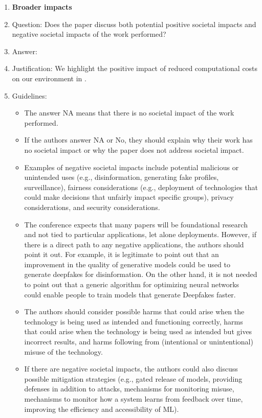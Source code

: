 \documentclass{article}
\begin{document}
\begin{enumerate}
\item {\bf Broader impacts}
    \item[] Question: Does the paper discuss both potential positive societal impacts and negative societal impacts of the work performed?
    \item[] Answer: \answerYes{} %
    \item[] Justification: We highlight the positive impact of reduced computational costs on our environment in .
    \item[] Guidelines:
    \begin{itemize}
        \item The answer NA means that there is no societal impact of the work performed.
        \item If the authors answer NA or No, they should explain why their work has no societal impact or why the paper does not address societal impact.
        \item Examples of negative societal impacts include potential malicious or unintended uses (e.g., disinformation, generating fake profiles, surveillance), fairness considerations (e.g., deployment of technologies that could make decisions that unfairly impact specific groups), privacy considerations, and security considerations.
        \item The conference expects that many papers will be foundational research and not tied to particular applications, let alone deployments. However, if there is a direct path to any negative applications, the authors should point it out. For example, it is legitimate to point out that an improvement in the quality of generative models could be used to generate deepfakes for disinformation. On the other hand, it is not needed to point out that a generic algorithm for optimizing neural networks could enable people to train models that generate Deepfakes faster.
        \item The authors should consider possible harms that could arise when the technology is being used as intended and functioning correctly, harms that could arise when the technology is being used as intended but gives incorrect results, and harms following from (intentional or unintentional) misuse of the technology.
        \item If there are negative societal impacts, the authors could also discuss possible mitigation strategies (e.g., gated release of models, providing defenses in addition to attacks, mechanisms for monitoring misuse, mechanisms to monitor how a system learns from feedback over time, improving the efficiency and accessibility of ML).
    \end{itemize}
    

\end{enumerate}
\end{document}
